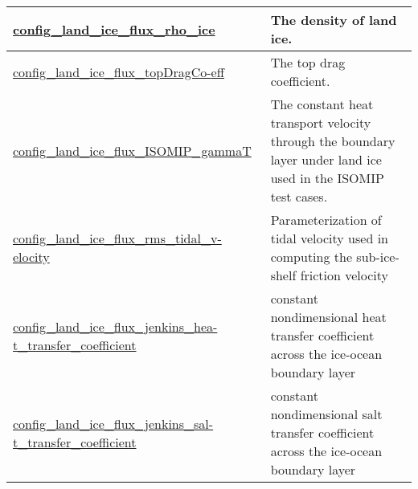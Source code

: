 {\begin{center}
\begin{longtable}{| p{2.0in} || p{4.0in} |}
    \hline
    \hyperref[subsec:nm_sec_config_land_ice_flux_rho_ice]{config\_land\_ice\_flux\_rho\_ice} & The density of land ice. \\
    \hline
    \hyperref[subsec:nm_sec_config_land_ice_flux_topDragCoeff]{config\_land\_ice\_flux\_topDragCo-}\hyperref[subsec:nm_sec_config_land_ice_flux_topDragCoeff]{eff}& The top drag coefficient. \\
    \hline
    \hyperref[subsec:nm_sec_config_land_ice_flux_ISOMIP_gammaT]{config\_land\_ice\_flux\_ISOMIP\_gammaT} & The constant heat transport velocity through the boundary layer under land ice used in the ISOMIP test cases. \\
    \hline
    \hyperref[subsec:nm_sec_config_land_ice_flux_rms_tidal_velocity]{config\_land\_ice\_flux\_rms\_tidal\_v-}\hyperref[subsec:nm_sec_config_land_ice_flux_rms_tidal_velocity]{elocity}& Parameterization of tidal velocity used in computing the sub-ice-shelf friction velocity \\
    \hline
    \hyperref[subsec:nm_sec_config_land_ice_flux_jenkins_heat_transfer_coefficient]{config\_land\_ice\_flux\_jenkins\_hea-}\hyperref[subsec:nm_sec_config_land_ice_flux_jenkins_heat_transfer_coefficient]{t\_transfer\_coefficient}& constant nondimensional heat transfer coefficient across the ice-ocean boundary layer \\
    \hline
    \hyperref[subsec:nm_sec_config_land_ice_flux_jenkins_salt_transfer_coefficient]{config\_land\_ice\_flux\_jenkins\_sal-}\hyperref[subsec:nm_sec_config_land_ice_flux_jenkins_salt_transfer_coefficient]{t\_transfer\_coefficient}& constant nondimensional salt transfer coefficient across the ice-ocean boundary layer \\
    \hline
\end{longtable}
\end{center}
}
